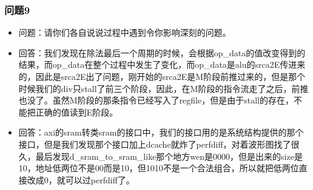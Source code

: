 \subsubsection{问题9}
\begin{itemize}
    \item 问题：请你们各自说说过程中遇到令你影响深刻的问题。
    \item \stunamea 回答：我们发现在除法最后一个周期的时候，会根据op\_data的值改变得到的结果，而op\_data在整个过程中发生了变化，而op\_data是alu的srca2E传进来的，因此是srca2E出了问题，刚开始的srca2E是M阶段前推过来的，但是那个时候我们的div只stall了前三个阶段，因此，在M阶段的指令流走了之后，前推也没了。虽然M阶段的那条指令已经写入了regfile，但是由于stall的存在，不能把正确的值读到E阶段。
    \item \stunameb 回答：axi的sram转类sram的接口中，我们的接口用的是系统结构提供的那个接口，但是我们发现那个接口加上dcache就炸了perfdiff，对着波形图找了很久，最后发现d\_sram\_to\_sram\_like那个地方wen是0000，但是出来的size是10，地址低两位不是00而是10，但1010不是一个合法组合，所以就把低两位直接改成0，就可以过perfdiff了。
\end{itemize}
